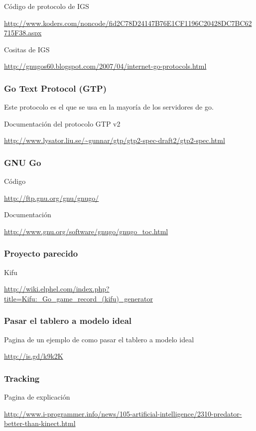 \documentclass[12pt,a4paper]{report}
\begin{document}
Código de protocolo de IGS

\url{http://www.koders.com/noncode/fid2C78D24147B76E1CF1196C20428DC7BC62715F38.aspx}

Cositas de IGS

\url{http://gnugos60.blogspot.com/2007/04/internet-go-protocols.html}

\subsubsection{Go Text Protocol (GTP)}

Este protocolo es el que se usa en la mayoría de los servidores de go. 

Documentación del protocolo GTP v2

\url{http://www.lysator.liu.se/~gunnar/gtp/gtp2-spec-draft2/gtp2-spec.html }

\subsubsection{GNU Go}

Código

\url{http://ftp.gnu.org/gnu/gnugo/}

Documentación

\url{http://www.gnu.org/software/gnugo/gnugo_toc.html}

\subsubsection{Proyecto parecido}

Kifu

\url{http://wiki.elphel.com/index.php?title=Kifu:_Go_game_record_(kifu)_generator}

\subsubsection{Pasar el tablero a modelo ideal}

Pagina de un ejemplo de como pasar el tablero a modelo ideal

\url{http://is.gd/k9k2K}


\subsubsection{Tracking }

Pagina de explicación

\url{http://www.i-programmer.info/news/105-artificial-intelligence/2310-predator-better-than-kinect.html}
\end{document}
